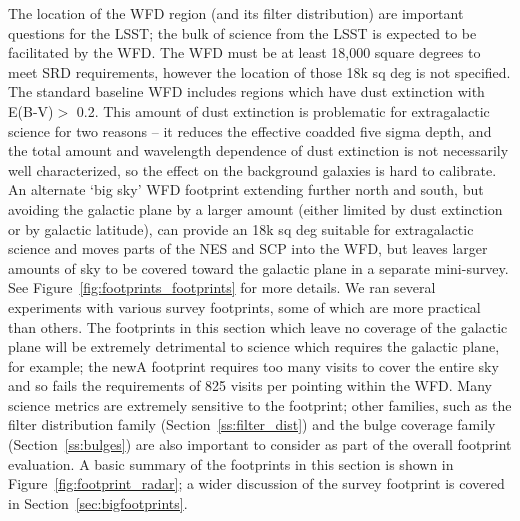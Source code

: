 The location of the WFD region (and its filter distribution) are important questions for the LSST; the bulk of science from the LSST is expected to be facilitated by the WFD. The WFD must be at least 18,000 square degrees to meet SRD requirements, however the location of those 18k sq deg is not specified. The standard baseline WFD includes regions which have dust extinction with E(B-V)$>$ 0.2. This amount of dust extinction is problematic for extragalactic science for two reasons --  it reduces the effective coadded five sigma depth, and the total amount and wavelength dependence of dust extinction is not necessarily well characterized, so the effect on the background galaxies is hard to calibrate. An alternate `big sky' WFD footprint extending further north and south, but avoiding the galactic plane by a larger amount (either limited by dust extinction or by galactic latitude), can provide an 18k sq deg suitable for extragalactic science and moves parts of the NES and SCP into the WFD, but leaves larger amounts of sky to be covered toward the galactic plane in a separate mini-survey. See Figure~\ref{fig:footprints_footprints} for more details. We ran several experiments with various survey footprints, some of which are more practical than others. The footprints in this section which leave no coverage of the galactic plane will be extremely detrimental to science which requires the galactic plane, for example; the newA footprint requires too many visits to cover the entire sky and so fails the requirements of 825 visits per pointing within the WFD. Many science metrics are extremely sensitive to the footprint; other families, such as the filter distribution family (Section~\ref{ss:filter_dist}) and the bulge coverage family (Section~\ref{ss:bulges}) are also important to consider as part of the overall footprint evaluation. A basic summary of the footprints in this section is shown in Figure~\ref{fig:footprint_radar}; a wider discussion of the survey footprint is covered in Section~\ref{sec:bigfootprints}. 


